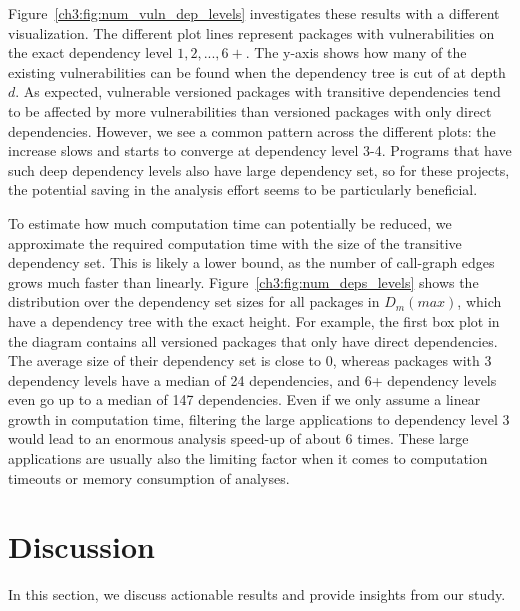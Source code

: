 Figure~\ref{ch3:fig:num_vuln_dep_levels} investigates these results with a different visualization.
The different plot lines represent packages with vulnerabilities on the exact dependency level $1,2,..., 6+$.
The y-axis shows how many of the existing vulnerabilities can be found when the dependency tree is cut of at depth $d$.
As expected, vulnerable versioned packages with transitive dependencies tend to be affected by more vulnerabilities than versioned packages with only direct dependencies.
However, we see a common pattern across the different plots: the increase slows and starts to converge at dependency level 3-4.
Programs that have such deep dependency levels also have large dependency set, so for these projects, the potential saving in the analysis effort seems to be particularly beneficial.

To estimate how much computation time can potentially be reduced, we approximate the required computation time with the size of the transitive dependency set.
This is likely a lower bound, as the number of call-graph edges grows much faster than linearly.
Figure~\ref{ch3:fig:num_deps_levels} shows the distribution over the dependency set sizes for all packages in $D_m(max)$, which have a dependency tree with the exact height.
For example, the first box plot in the diagram contains all versioned packages that only have direct dependencies.
The average size of their dependency set is close to 0, whereas packages with 3 dependency levels have a median of 24 dependencies, and 6+ dependency levels even go up to a median of 147 dependencies.
Even if we only assume a linear growth in computation time, filtering the large applications to dependency level 3 would lead to an enormous analysis speed-up of about 6 times.
These large applications are usually also the limiting factor when it comes to computation timeouts or memory consumption of analyses.
    
\section{Discussion}\label{ch3:sec:discussion}
In this section, we discuss actionable results and provide insights from our study.

